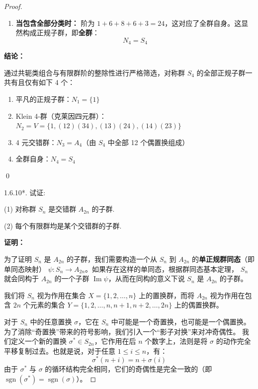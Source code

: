 \documentclass[]{article}
\begin{document}
\begin{proof}
\begin{enumerate}
	\item \textbf{当包含全部分类时：}
	阶为 $1 + 6 + 8 + 6 + 3 = 24$，这对应了全群自身。这显然构成正规子群，即\textbf{全群}：
	\[ N_4 = S_4 \]
\end{enumerate}

\bigskip
\noindent \textbf{结论：} 

通过共轭类组合与有限群阶的整除性进行严格筛选，对称群 $S_4$ 的全部正规子群一共有且仅有如下 4 个：
\begin{enumerate}
	\item 平凡的正规子群：$N_1 = \{1\}$
	\item Klein 4-群（克莱因四元群）：$N_2 = V = \{1, (12)(34), (13)(24), (14)(23)\}$
	\item 4 元交错群：$N_3 = A_4$（由 $S_4$ 中全部 12 个偶置换组成）
	\item 全群自身：$N_4 = S_4$
\end{enumerate}

\qed

1.6.10*. 试证:

(1) 对称群 $S_{n}$ 是交错群 $A_{2n}$ 的子群. 

(2) 每个有限群均是某个交错群的子群. 

\medskip
\noindent \textbf{证明：}

为了证明 $S_n$ 是 $A_{2n}$ 的子群，我们需要构造一个从 $S_n$ 到 $A_{2n}$ 的\textbf{单正规群同态}（即单同态映射） $\psi: S_n \to A_{2n}$。如果存在这样的单同态，根据群同态基本定理， $S_n$ 就会同构于 $A_{2n}$ 的一个子群 $\operatorname{Im}\psi$，从而在同构的意义下说 $S_n$ 是 $A_{2n}$ 的子群。

我们将 $S_n$ 视为作用在集合 $X = \{1, 2, \dots, n\}$ 上的置换群，而将 $A_{2n}$ 视为作用在包含 $2n$ 个元素的集合 $Y = \{1, 2, \dots, n, n+1, n+2, \dots, 2n\}$ 上的偶置换群。

对于 $S_n$ 中的任意置换 $\sigma$，它在 $S_n$ 中可能是一个奇置换，也可能是一个偶置换。为了消除“奇置换”带来的符号影响，我们引入一个“影子对换”来对冲奇偶性。
我们定义一个新的置换 $\sigma^* \in S_{2n}$，它作用在后 $n$ 个数字上，法则是将 $\sigma$ 的动作完全平移复制过去。也就是说，对于任意 $1 \le i \le n$，有：
\[ \sigma^*(n+i) = n + \sigma(i) \]
由于 $\sigma^*$ 与 $\sigma$ 的循环结构完全相同，它们的奇偶性是完全一致的（即 $\operatorname{sgn}(\sigma^*) = \operatorname{sgn}(\sigma)$）。


\end{proof}
\end{document}
